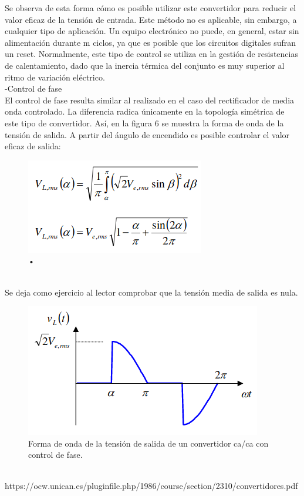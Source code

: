 \documentclass[10pt,a4paper]{article}
\begin{document}
Se  observa  de  esta  forma  cómo  es  posible  utilizar  este  convertidor  para  reducir  el  valor  eficaz  de  la  tensión de entrada. Este método no es aplicable, sin embargo, a cualquier tipo de aplicación. Un equipo electrónico  no  puede,  en  general,  estar  sin  alimentación  durante  m  ciclos,  ya  que  es  posible  que  los  circuitos  digitales  sufran  un  reset.  Normalmente,  este  tipo  de  control  se  utiliza  en  la  gestión  de  resistencias  de  calentamiento,  dado  que  la  inercia  térmica  del  conjunto  es  muy  superior  al  ritmo  de  variación eléctrico.\\
-Control de fase\\ El control de fase resulta similar al realizado en el caso del rectificador de media onda controlado. La diferencia radica únicamente en la topología simétrica de este tipo de convertidor. Así, en la figura 6 se  muestra  la  forma  de  onda  de  la  tensión  de  salida.  A  partir  del  ángulo  de  encendido  es  posible  controlar el valor eficaz de salida:\\
\begin{figure}[hbtp]
\caption{•}
\centering
\includegraphics[scale=0.4]{ecn.png}
\end{figure}\\
Se deja como ejercicio al lector comprobar que la tensión media de salida es nula.\\
\begin{figure}[hbtp]
\centering
\includegraphics[scale=0.4]{onda.png}
\caption{ Forma de onda de la tensión de salida de un convertidor ca/ca con control de fase.}
\end{figure}
\\


{https://ocw.unican.es/pluginfile.php/1986/course/section/2310/convertidores.pdf}

\end{document}
